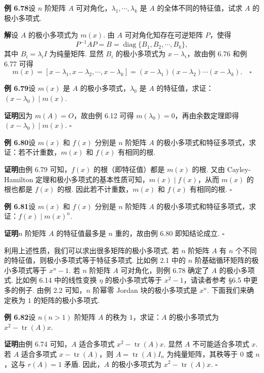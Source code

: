 \documentclass[UTF8,12pt,a4paper,fontset=fandol]{ctexart}
\begin{document}
\noindent\textbf{例 6.78}\quad 设 $n$ 阶矩阵 $A$ 可对角化，$\lambda_1,\cdots,\lambda_k$ 是 $A$ 的全体不同的特征值，试求 $A$ 的极小多项式.

\noindent\textbf{解}\quad 设 $A$ 的极小多项式为 $m(x)$. 由 $A$ 可对角化知存在可逆矩阵 $P$，使得
\[
P^{-1}AP=B=\operatorname{diag}\{B_1,B_2,\cdots,B_k\},
\]
其中 $B_i=\lambda_iI$ 为纯量矩阵. 显然 $B_i$ 的极小多项式为 $x-\lambda_i$，故由例 6.76 和例 6.77 可得
\[
m(x)=[x-\lambda_1,x-\lambda_2,\cdots,x-\lambda_k]=(x-\lambda_1)(x-\lambda_2)\cdots(x-\lambda_k). \quad \square
\]

\noindent\textbf{例 6.79}\quad 设 $m(x)$ 是 $A$ 的极小多项式，$\lambda_0$ 是 $A$ 的特征值，求证：$(x-\lambda_0)\mid m(x)$.

\noindent\textbf{证明}\quad 因为 $m(A)=O$，故由例 6.12 可得 $m(\lambda_0)=0$，再由余数定理即得 $(x-\lambda_0)\mid m(x)$. $\square$

\noindent\textbf{例 6.80}\quad 设 $m(x)$ 和 $f(x)$ 分别是 $n$ 阶矩阵 $A$ 的极小多项式和特征多项式，求证：若不计重数，$m(x)$ 和 $f(x)$ 有相同的根.

\noindent\textbf{证明}\quad 由例 6.79 可知，$f(x)$ 的根（即特征值）都是 $m(x)$ 的根. 又由 Cayley-Hamilton 定理和极小多项式的基本性质可知，$m(x)\mid f(x)$，从而 $m(x)$ 的根也都是 $f(x)$ 的根. 因此若不计重数，$m(x)$ 和 $f(x)$ 有相同的根. $\square$

\noindent\textbf{例 6.81}\quad 设 $m(x)$ 和 $f(x)$ 分别是 $n$ 阶矩阵 $A$ 的极小多项式和特征多项式，求证：$f(x)\mid m(x)^n$.

\noindent\textbf{证明}\quad $n$ 阶矩阵 $A$ 的特征值最多是 $n$ 重的，故由例 6.80 即知结论成立. $\square$

利用上述性质，我们可以求出很多矩阵的极小多项式. 若 $n$ 阶矩阵 $A$ 有 $n$ 个不同的特征值，则极小多项式等于特征多项式. 比如例 2.1 中的 $n$ 阶基础循环矩阵的极小多项式等于 $x^n-1$. 若 $n$ 阶矩阵 $A$ 可对角化，则例 6.78 确定了 $A$ 的极小多项式. 比如例 6.14 中的线性变换 $\eta$ 的极小多项式等于 $x^2-1$，请读者参考 \S 6.5 中更多的例子. 由例 2.2 可知，$n$ 阶幂零 Jordan 块的极小多项式是 $x^n$. 下面我们来确定秩为 $1$ 的矩阵的极小多项式.

\noindent\textbf{例 6.82}\quad 设 $n(n>1)$ 阶矩阵 $A$ 的秩为 $1$，求证：$A$ 的极小多项式为 $x^2-\operatorname{tr}(A)x$.

\noindent\textbf{证明}\quad 由例 6.74 可知，$A$ 适合多项式 $x^2-\operatorname{tr}(A)x$. 显然 $A$ 不可能适合多项式 $x$. 若 $A$ 适合多项式 $x-\operatorname{tr}(A)$，则 $A=\operatorname{tr}(A)I_n$ 为纯量矩阵，其秩等于 $0$ 或 $n$，这与 $r(A)=1$ 矛盾. 因此，$A$ 的极小多项式为 $x^2-\operatorname{tr}(A)x$. $\square$
\end{document}

